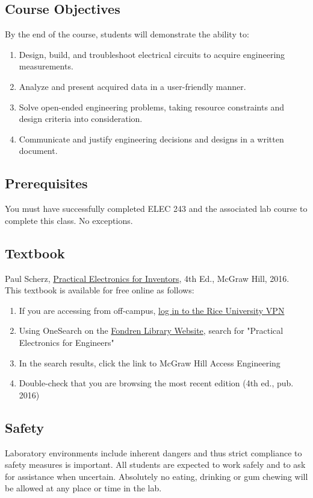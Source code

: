\documentclass{article}
\begin{document}
\subsection*{Course Objectives}
By the end of the course, students will demonstrate the ability to:

\begin{enumerate}
	\item Design, build, and troubleshoot electrical circuits to acquire engineering measurements.
	\item Analyze and present acquired data in a user-friendly manner.
	\item Solve open-ended engineering problems, taking resource constraints and design criteria into consideration.
	\item Communicate and justify engineering decisions and designs in a written document.
\end{enumerate}

\subsection*{Prerequisites}
You must have successfully completed ELEC 243 and the associated lab course to complete this class. No exceptions.

\subsection*{Textbook}
Paul Scherz, \underline{Practical Electronics for Inventors}, 4th Ed., McGraw Hill, 2016.\\

This textbook is available for free online as follows:

\begin{enumerate}
	\item If you are accessing from off-campus, \href{https://kb.rice.edu/82263}{log in to the Rice University VPN}
	\item Using OneSearch on the \href{https://library.rice.edu}{Fondren Library Website}, search for "Practical Electronics for Engineers"
	\item In the search results, click the link to McGraw Hill Access Engineering
	\item Double-check that you are browsing the most recent edition (4th ed., pub. 2016)
\end{enumerate}

\subsection*{Safety}
Laboratory environments include inherent dangers and thus strict compliance to safety measures is important. All students are expected to work safely and to ask for assistance when uncertain. Absolutely no eating, drinking or gum chewing will be allowed at any place or time in the lab.
\end{document}
